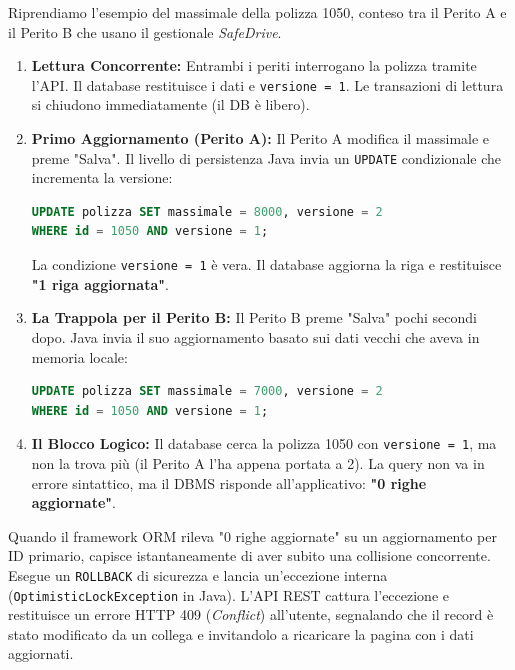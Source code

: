 \begin{example}
Riprendiamo l'esempio del massimale della polizza 1050, conteso tra il Perito A e il Perito B che usano il gestionale \textit{SafeDrive}.
\begin{enumerate}
    \item \textbf{Lettura Concorrente:} Entrambi i periti interrogano la polizza tramite l'API. Il database restituisce i dati e \texttt{versione = 1}. Le transazioni di lettura si chiudono immediatamente (il DB è libero).
    \item \textbf{Primo Aggiornamento (Perito A):} Il Perito A modifica il massimale e preme "Salva". Il livello di persistenza Java invia un \texttt{UPDATE} condizionale che incrementa la versione:
\begin{lstlisting}[language=SQL, basicstyle=\ttfamily\small, keywordstyle=\color{blue}\bfseries]
UPDATE polizza SET massimale = 8000, versione = 2 
WHERE id = 1050 AND versione = 1;
\end{lstlisting}
    La condizione \texttt{versione = 1} è vera. Il database aggiorna la riga e restituisce \textbf{"1 riga aggiornata"}.
    \item \textbf{La Trappola per il Perito B:} Il Perito B preme "Salva" pochi secondi dopo. Java invia il suo aggiornamento basato sui dati vecchi che aveva in memoria locale:
\begin{lstlisting}[language=SQL, basicstyle=\ttfamily\small, keywordstyle=\color{blue}\bfseries]
UPDATE polizza SET massimale = 7000, versione = 2 
WHERE id = 1050 AND versione = 1;
\end{lstlisting}
    \item \textbf{Il Blocco Logico:} Il database cerca la polizza 1050 con \texttt{versione = 1}, ma non la trova più (il Perito A l'ha appena portata a 2). La query non va in errore sintattico, ma il DBMS risponde all'applicativo: \textbf{"0 righe aggiornate"}.
\end{enumerate}

Quando il framework ORM rileva "0 righe aggiornate" su un aggiornamento per ID primario, capisce istantaneamente di aver subito una collisione concorrente. Esegue un \texttt{ROLLBACK} di sicurezza e lancia un'eccezione interna (\texttt{OptimisticLockException} in Java). L'API REST cattura l'eccezione e restituisce un errore HTTP 409 (\textit{Conflict}) all'utente, segnalando che il record è stato modificato da un collega e invitandolo a ricaricare la pagina con i dati aggiornati.
\end{example}

